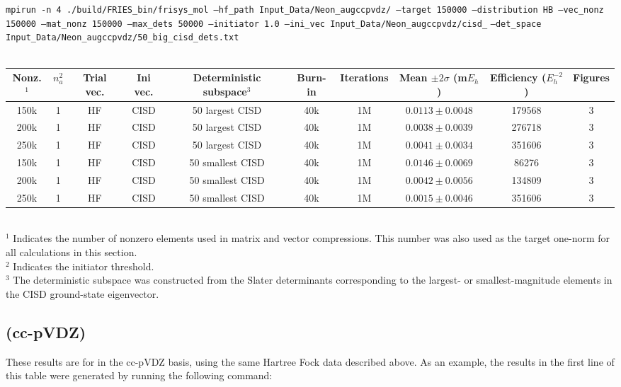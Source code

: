 \documentclass[12pt, landscape]{article}
\begin{document}
\texttt{mpirun -n 4 ./build/FRIES\_bin/frisys\_mol --hf\_path Input\_Data/Neon\_augccpvdz/ --target 150000 --distribution HB --vec\_nonz 150000 --mat\_nonz 150000 --max\_dets 50000 --initiator 1.0 --ini\_vec Input\_Data/Neon\_augccpvdz/cisd\_} \texttt{--det\_space Input\_Data/Neon\_augccpvdz/50\_big\_cisd\_dets.txt}
\\~\\
\begin{tabular}{c|c|c|c|c|c|c|c|c|c}
Nonz.$^1$ & $n_a^2$ & Trial vec. & Ini vec. & Deterministic subspace$^3$ & Burn-in & Iterations & Mean $\pm 2 \sigma$ (m$E_h$) & Efficiency ($E_h^{-2}$) & Figures \\ \hline
150k & 1 & HF & CISD & 50 largest CISD & 40k & 1M & $0.0113 \pm 0.0048$ & 179568 & 3 \\
200k & 1 & HF & CISD & 50 largest CISD & 40k & 1M & $0.0038 \pm 0.0039$ & 276718 & 3 \\
250k & 1 & HF & CISD & 50 largest CISD & 40k & 1M & $0.0041 \pm 0.0034$ & 351606 & 3 \\
150k & 1 & HF & CISD & 50 smallest CISD & 40k & 1M & $0.0146 \pm 0.0069$ & 86276 & 3 \\
200k & 1 & HF & CISD & 50 smallest CISD & 40k & 1M & $0.0042 \pm 0.0056$ & 134809 & 3 \\
250k & 1 & HF & CISD & 50 smallest CISD & 40k & 1M & $0.0015 \pm 0.0046$ & 351606 & 3 \\
\end{tabular}
\\
$^1$ Indicates the number of nonzero elements used in matrix and vector compressions. This number was also used as the target one-norm for all calculations in this section. \\
$^2$ Indicates the initiator threshold. \\
$^3$ The deterministic subspace was constructed from the Slater determinants corresponding to the largest- or smallest-magnitude elements in the CISD ground-state eigenvector.

\subsection*{ (cc-pVDZ)}
These results are for  in the cc-pVDZ basis, using the same Hartree Fock data described above. As an example, the results in the first line of this table were generated by running the following command:
\end{document}
